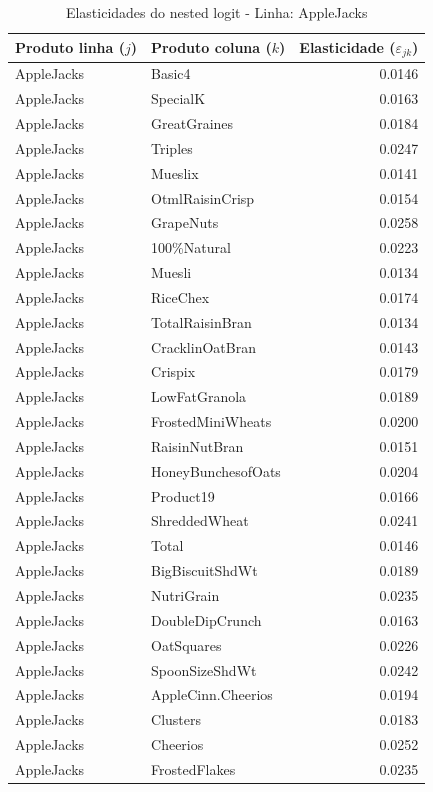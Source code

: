 \begingroup
\begin{table}[H]
\centering
\caption{Elasticidades do nested logit - Linha: AppleJacks}
\label{tab:elas-nested-applejacks}
\small
\begin{tabular}{llr}
\toprule
Produto linha ($j$) & Produto coluna ($k$) & Elasticidade ($\varepsilon_{jk}$) \\
\midrule
AppleJacks & Basic4 & 0.0146 \\
AppleJacks & SpecialK & 0.0163 \\
AppleJacks & GreatGraines & 0.0184 \\
AppleJacks & Triples & 0.0247 \\
AppleJacks & Mueslix & 0.0141 \\
AppleJacks & OtmlRaisinCrisp & 0.0154 \\
AppleJacks & GrapeNuts & 0.0258 \\
AppleJacks & 100\%Natural & 0.0223 \\
AppleJacks & Muesli & 0.0134 \\
AppleJacks & RiceChex & 0.0174 \\
AppleJacks & TotalRaisinBran & 0.0134 \\
AppleJacks & CracklinOatBran & 0.0143 \\
AppleJacks & Crispix & 0.0179 \\
AppleJacks & LowFatGranola & 0.0189 \\
AppleJacks & FrostedMiniWheats & 0.0200 \\
AppleJacks & RaisinNutBran & 0.0151 \\
AppleJacks & HoneyBunchesofOats & 0.0204 \\
AppleJacks & Product19 & 0.0166 \\
AppleJacks & ShreddedWheat & 0.0241 \\
AppleJacks & Total & 0.0146 \\
AppleJacks & BigBiscuitShdWt & 0.0189 \\
AppleJacks & NutriGrain & 0.0235 \\
AppleJacks & DoubleDipCrunch & 0.0163 \\
AppleJacks & OatSquares & 0.0226 \\
AppleJacks & SpoonSizeShdWt & 0.0242 \\
AppleJacks & AppleCinn.Cheerios & 0.0194 \\
AppleJacks & Clusters & 0.0183 \\
AppleJacks & Cheerios & 0.0252 \\
AppleJacks & FrostedFlakes & 0.0235 \\

\end{tabular}
\end{table}
